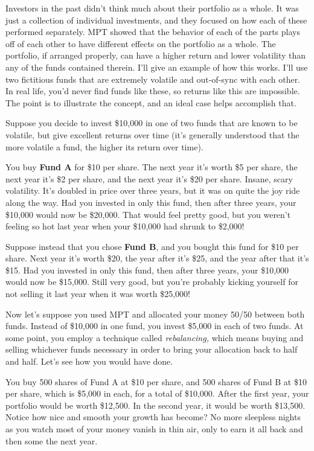 Investors in the past didn't think much about their portfolio as a whole. It was just a collection of individual investments, and they focused on how each of these performed separately. MPT showed that the behavior of each of the parts plays off of each other to have different effects on the portfolio as a whole. The portfolio, if arranged properly, can have a higher return and lower volatility than any of the funds contained therein. I'll give an example of how this works. I'll use two fictitious funds that are extremely volatile and out-of-sync with each other. In real life, you'd never find funds like these, so returns like this are impossible. The point is to illustrate the concept, and an ideal case helps accomplish that.

Suppose you decide to invest \$10,000 in one of two funds that are known to be volatile, but give excellent returns over time (it's generally understood that the more volatile a fund, the higher its return over time).

You buy \textbf{Fund A} for \$10 per share. The next year it's worth \$5 per share, the next year it's \$2 per share, and the next year it's \$20 per share. Insane, scary volatility. It's doubled in price over three years, but it was on quite the joy ride along the way. Had you invested in only this fund, then after three years, your \$10,000 would now be \$20,000. That would feel pretty good, but you weren't feeling so hot last year when your \$10,000 had shrunk to \$2,000!

Suppose instead that you chose \textbf{Fund B}, and you bought this fund for \$10 per share. Next year it's worth \$20, the year after it's \$25, and the year after that it's \$15. Had you invested in only this fund, then after three years, your \$10,000 would now be \$15,000. Still very good, but you're probably kicking yourself for not selling it last year when it was worth \$25,000!

Now let's suppose you used MPT and allocated your money 50/50 between both funds. Instead of \$10,000 in one fund, you invest \$5,000 in each of two funds. At some point, you employ a technique called \emph{rebalancing,} which means buying and selling whichever funds necessary in order to bring your allocation back to half and half. Let's see how you would have done.

You buy 500 shares of Fund A at \$10 per share, and 500 shares of Fund B at \$10 per share, which is \$5,000 in each, for a total of \$10,000. After the first year, your portfolio would be worth \$12,500. In the second year, it would be worth \$13,500. Notice how nice and smooth your growth has become? No more sleepless nights as you watch most of your money vanish in thin air, only to earn it all back and then some the next year.

